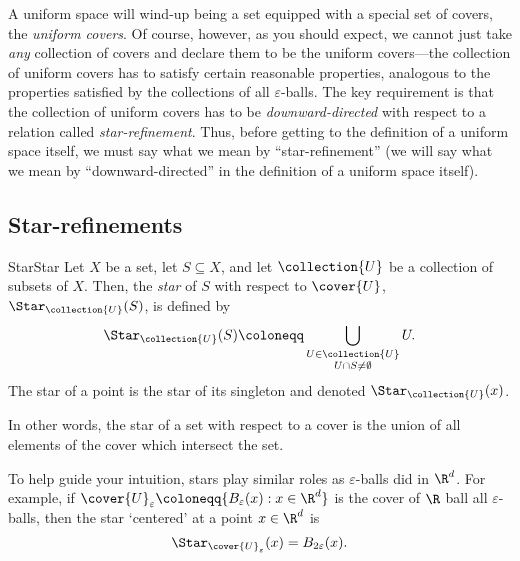 A uniform space will wind-up being a set equipped with a special set of covers, the \emph{uniform covers}.  Of course, however, as you should expect, we cannot just take \emph{any} collection of covers and declare them to be the uniform covers---the collection of uniform covers has to satisfy certain reasonable properties, analogous to the properties satisfied by the collections of all $\varepsilon$-balls.  The key requirement is that the collection of uniform covers has to be \emph{downward-directed} with respect to a relation called \emph{star-refinement}.  Thus, before getting to the definition of a uniform space itself, we must say what we mean by ``star-refinement'' (we will say what we mean by ``downward-directed'' in the definition of a uniform space itself).

\subsection{Star-refinements}

\begin{dfn}{Star}{Star}
Let $X$ be a set, let $S\subseteq X$, and let $\collection{U}$ be a collection of subsets of $X$.  Then, the \emph{star} of $S$ with respect to $\cover{U}$, $\Star _{\collection{U}}(S)$, is defined by
\begin{equation}
\Star _{\collection{U}}(S)\coloneqq \bigcup _{\substack{U\in \collection{U} \\ U\cap S\neq \emptyset}}U.
\end{equation}
The star of a point is the star of its singleton and denoted $\Star _{\collection{U}}(x)$.
\begin{rmk}
In other words, the star of a set with respect to a cover is the union of all elements of the cover which intersect the set.
\end{rmk}
\end{dfn}
To help guide your intuition, stars play similar roles as $\varepsilon$-balls did in $\R ^d$.  For example, if $\cover{U}_{\varepsilon}\coloneqq \{ B_{\varepsilon}(x):x\in \R ^d\}$ is the cover of $\R$ ball all $\varepsilon$-balls, then the star `centered' at a point $x\in \R ^d$ is
\begin{equation}
\Star _{\cover{U}_{\varepsilon}}(x)=B_{2\varepsilon}(x).
\end{equation}

